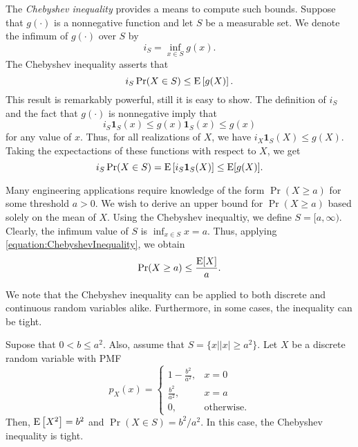 The \emph{Chebyshev inequality} provides a means to compute such bounds. 
Suppose that $g (\cdot)$ is a nonnegative function and let $S$ be a measurable set.
We denote the infimum of $g (\cdot)$ over $S$ by
\begin{equation*}
i_S = \inf_{ x \in S } g (x) .
\end{equation*}
The Chebyshev inequality asserts that
\begin{equation} \label{equation:ChebyshevInequality}
i_S \Pr (X \in S)
\leq \mathrm{E} \left[ g(X) \right] .
\end{equation}
This result is remarkably powerful, still it is easy to show.
The definition of $i_S$ and the fact that $g (\cdot)$ is nonnegative imply that
\begin{equation*}
i_S \mathbf{1}_S (x) \leq g(x) \mathbf{1}_S (x) \leq g(x)
\end{equation*}
for any value of $x$.
Thus, for all realizations of $X$, we have $i_X \mathbf{1}_S (X) \leq g(X)$.
Taking the expectactions of these functions with respect to $X$, we get
\begin{equation*}
i_S \Pr (X \in S)
= \mathrm{E} \left[ i_S \mathbf{1}_S (X) \right]
\leq \mathrm{E} [g (X)] .
\end{equation*}

\begin{example}
Many engineering applications require knowledge of the form $\Pr (X \geq a)$ for some threshold $a > 0$.
We wish to derive an upper bound for $\Pr (X \geq a)$ based solely on the mean of $X$.
Using the Chebyshev inequaltiy, we define $S = [a, \infty)$.
Clearly, the infimum value of $S$ is $\inf_{x \in S} x = a$.
Thus, applying \eqref{equation:ChebyshevInequality}, we obtain
\begin{equation*}
\Pr (X \geq a) \leq \frac{ \mathrm{E} [X] }{ a } .
\end{equation*}
\end{example}

We note that the Chebyshev inequality can be applied to both discrete and continuous random variables alike.
Furthermore, in some cases, the inequality can be tight.

\begin{example}
Supose that $0 < b \leq a^2$.
Also, assume that $S = \{ x | |x| \geq a^2 \}$.
Let $X$ be a discrete random variable with PMF
\begin{equation*}
p_X (x) = \left\{ \begin{array}{ll} 1 - \frac{b^2}{a^2}, & x = 0 \\
\frac{b^2}{a^2}, & x = a \\
0, & \text{otherwise.} \end{array} \right.
\end{equation*}
Then, $\mathrm{E} \left[ X^2 \right] = b^2$ and $\Pr (X \in S) = b^2 / a^2$.
In this case, the Chebyshev inequality is tight.
\end{example}

